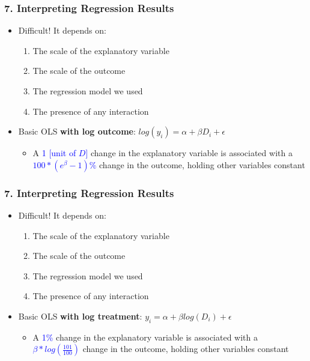 \documentclass[xcolor=x11names,compress]{beamer}\usepackage[]{graphicx}\usepackage[]{color}
\renewcommand{\(}{\begin{columns}}
\renewcommand{\)}{\end{columns}}
\newcommand{\<}[1]{\begin{column}{#1}}
\renewcommand{\>}{\end{column}}
\begin{document}
\begin{frame}
\frametitle{7. Interpreting Regression Results}
\begin{itemize}
\item Difficult! It depends on:
\begin{enumerate}
\item The scale of the explanatory variable
\item The scale of the outcome
\item The regression model we used
\item The presence of any interaction
\end{enumerate}
\item Basic OLS \textbf{with log outcome}: $log(y_i) = \alpha + \beta D_i + \epsilon$
\begin{itemize}
\item A \textcolor{blue}{1 [unit of $D$]} change in the explanatory variable is associated with a  \textcolor{blue}{$100*(e^{\beta}-1)\%$} change in the outcome, holding other variables constant
\end{itemize}
\end{itemize}
\end{frame}

\begin{frame}
\frametitle{7. Interpreting Regression Results}
\begin{itemize}
\item Difficult! It depends on:
\begin{enumerate}
\item The scale of the explanatory variable
\item The scale of the outcome
\item The regression model we used
\item The presence of any interaction
\end{enumerate}
\item Basic OLS \textbf{with log treatment}: $y_i = \alpha + \beta log(D_i) + \epsilon$
\begin{itemize}
\item A \textcolor{blue}{1\%} change in the explanatory variable is associated with a  \textcolor{blue}{$\beta*log(\frac{101}{100})$} change in the outcome, holding other variables constant
\end{itemize}
\end{itemize}
\end{frame}
\end{document}
